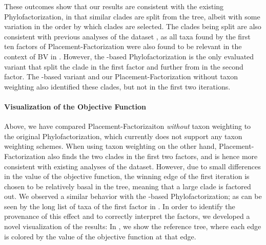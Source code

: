These outcomes show that our results are consistent with the existing Phylofactorization,
in that similar clades are split from the tree,
albeit with some variation in the order by which clades are selected. %
The clades being split are also consistent with previous analyses of the dataset \cite{Srinivasan2012},
as all taxa found by the first ten factors of Placement-Factorization
were also found to be relevant in the context of \acl{BV} in \cite{Srinivasan2012}.
However, the -based Phylofactorization is the only evaluated variant
that split the  clade in the first factor
and further  from  in the second factor.
The -based variant and our Placement-Factorization without taxon weighting also identified these clades,
but not in the first two iterations.


\paragraph{Visualization of the Objective Function}
\label{ch:Factorization:sec:Evaluation:sub:BVDataset:par:VizObjective}

Above, we have compared Placement-Factorizaiton \emph{without} taxon weighting to the original Phylofactorization,
which currently does not support any taxon weighting schemes.
When using taxon weighting on the other hand,
Placement-Factorization also finds the two  clades in the first two factors,
and is hence more consistent with existing analyses of the dataset.
However, due to small differences in the value of the objective function,
the winning edge of the first iteration
is chosen to be relatively basal in the tree, meaning that a large clade is factored out.
We observed a similar behavior with the -based Phylofactorization;
as can be seen by the long list of taxa of the first factor in .
In order to identify the provenance of this effect and to correctly interpret the factors,
we developed a novel visualization of the results:
In , we show the reference tree,
where each edge is colored by the value of the objective function at that edge.

